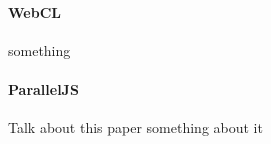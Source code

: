 
\paragraph{WebCL}
something

\paragraph{ParallelJS}
Talk about this paper \cite{paralleljs} something about it
